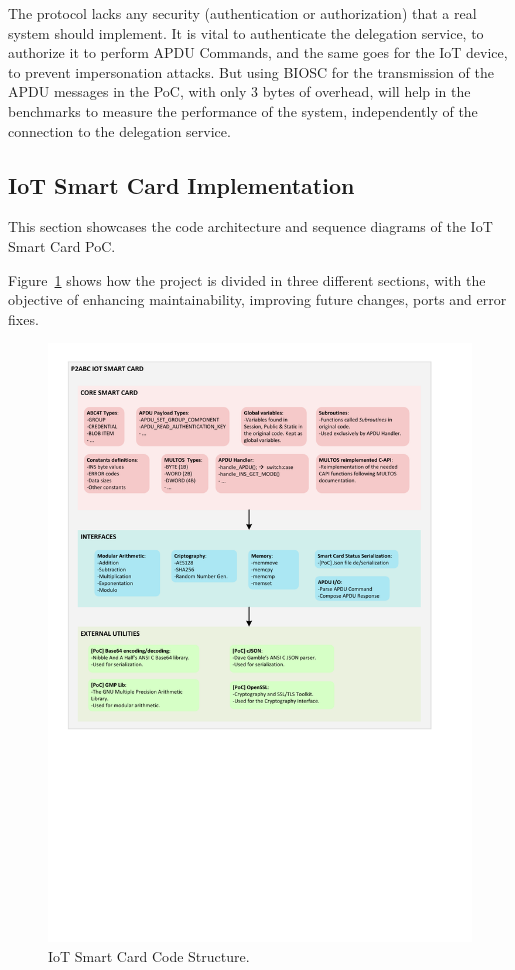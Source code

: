 The protocol lacks any security (authentication or authorization) that a real system should implement. It is vital to authenticate the delegation service, to authorize it to perform APDU Commands, and the same goes for the IoT device, to prevent impersonation attacks. But using BIOSC for the transmission of the APDU messages in the PoC, with only 3 bytes of overhead, will help in the  benchmarks to measure the performance of the system, independently of the connection to the delegation service.


\subsection{IoT Smart Card Implementation}

This section showcases the code architecture and sequence diagrams of the IoT Smart Card PoC.

%

Figure~\ref{fig:IoTCScomponents-color} shows how the project is divided in three different sections, with the objective of enhancing maintainability, improving future changes, ports and error fixes.


\begin{figure}[bth]
	\begin{center}
		\includegraphics[width=\linewidth]{gfx/IoTCScomponents-color}
	\end{center}
	\caption{IoT Smart Card Code Structure.}
	\label{fig:IoTCScomponents-color}
\end{figure}


